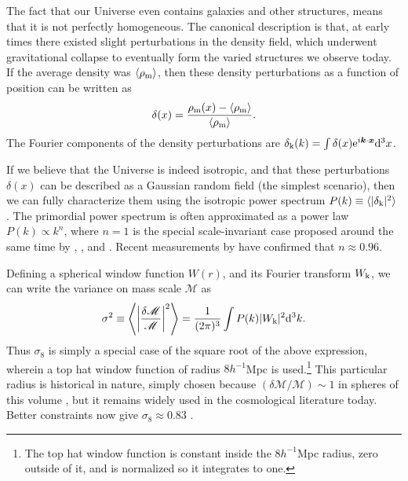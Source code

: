 The fact that our Universe even contains galaxies and other structures, means that it is not perfectly homogeneous. The canonical description is that, at early times there existed slight perturbations in the density field, which underwent gravitational collapse to eventually form the varied structures we observe today. If the average density was $\langle \rho_{\rm m} \rangle$, then these density perturbations as a function of position can be written as
\begin{equation}
\delta(x) = \frac{\rho_{\rm m}(x) - \langle \rho_{\rm m} \rangle}{\langle \rho_{\rm m} \rangle}.
\end{equation}
The Fourier components of the density perturbations are $\delta_{\rm k}(k) = \int \delta(x) {\rm e}^{i {\bm k} \cdot {\bm x}}{\rm d}^3x$. 

If we believe that the Universe is indeed isotropic, and that these perturbations $\delta(x)$ can be described as a Gaussian random field (the simplest scenario), then we can fully characterize them using the isotropic power spectrum $P(k) \equiv \langle | \delta_{\rm k} |^2 \rangle$ \citep{PeeblesText,Kravtsov12}. The primordial power spectrum is often approximated as a power law $P(k) \propto k^n$, where $n=1$ is the special scale-invariant case proposed around the same time by \citet{Harrison70}, \citet{PeeblesYu70}, and \citet{Zeldovich72}. Recent measurements by \citet{PlanckXVI} have confirmed that $n \approx 0.96$.

Defining a spherical window function $W(r)$, and its Fourier transform $W_{\rm k}$, we can write the variance on mass scale ${\mathscr M}$ as 
\begin{equation}
\sigma^2 \equiv \left\langle \left| \frac{\delta {\mathscr M}}{\mathscr M} \right|^2 \right\rangle = \frac{1}{(2\pi)^3} \int P(k) |W_{\rm k}|^2 {\rm d}^3k.
\end{equation}
Thus $\sigma_8$ is simply a special case of the square root of the above expression, wherein a top hat window function of radius $8 h^{-1}$Mpc is used.\footnote{The top hat window function is constant inside the $8 h^{-1}$Mpc radius, zero outside of it, and is normalized so it integrates to one.} This particular radius is historical in nature, simply chosen because $(\delta {\mathscr M}/{\mathscr M}) \sim 1$ in spheres of this volume \citep{DavisPeebles83}, but it remains widely used in the cosmological literature today. Better constraints now give $\sigma_8 \approx 0.83$ \citep{PlanckXVI}.

